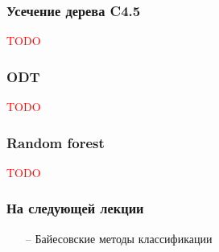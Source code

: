 \documentclass[12pt]{beamer}
\begin{document}
\begin{frame}\frametitle{Усечение дерева C4.5}
\textcolor{red}{TODO}
\end{frame}

\begin{frame}\frametitle{ODT}
\textcolor{red}{TODO}
\end{frame}

\begin{frame}\frametitle{Random forest}
\textcolor{red}{TODO}
\end{frame}

\begin{frame}\frametitle{На следующей лекции}
\begin{itemize}
\item[--] Байесовские методы классификации
\end{itemize}
\end{frame}
\end{document}
